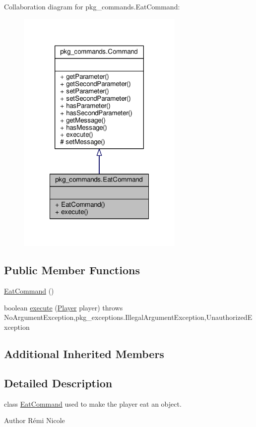 Collaboration diagram for pkg\-\_\-commands.\-Eat\-Command\-:
\nopagebreak
\begin{figure}[H]
\begin{center}
\leavevmode
\includegraphics[width=228pt]{classpkg__commands_1_1EatCommand__coll__graph}
\end{center}
\end{figure}
\subsection*{Public Member Functions}
\begin{DoxyCompactItemize}
\item 
\hyperlink{classpkg__commands_1_1EatCommand_ad83dfae54a7d24140beff2b00201e065}{Eat\-Command} ()
\item 
boolean \hyperlink{classpkg__commands_1_1EatCommand_a2a600f09891aa076b3f630293de965f4}{execute} (\hyperlink{classpkg__world_1_1Player}{Player} player)  throws No\-Argument\-Exception,pkg\-\_\-exceptions.\-Illegal\-Argument\-Exception,\-Unauthorized\-Exception 
\end{DoxyCompactItemize}
\subsection*{Additional Inherited Members}


\subsection{Detailed Description}
class \hyperlink{classpkg__commands_1_1EatCommand}{Eat\-Command} used to make the player eat an object. \begin{DoxyAuthor}{Author}
Rémi Nicole 
\end{DoxyAuthor}


